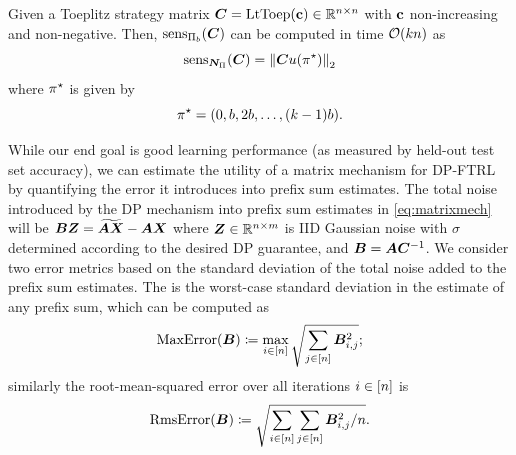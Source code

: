 \begin{theorem}\label{thm:toepminsepsens}
Given a Toeplitz strategy matrix ${\bm{C}} = \text{LtToep}(\mathbf{c}) \in \mathbb{R}^{n \times n}$ with $\mathbf{c}$ non-increasing and non-negative. Then, $\operatorname{sens}_{\Pi_b}({\bm{C}})$ can be computed in time $\mathcal{O}(k n)$  as
\[
  \operatorname{sens}_{{\bm{N}}_\Pi}({\bm{C}}) = \left\|{{\bm{C}} u(\pi^\star)}\right\|_2
\]
where $\pi^\star$ is given by
\begin{equation}\label{eq:badpi}
\pi^\star = (0, b, 2b, \dots, (k-1)b).
\end{equation}
\end{theorem}


\label{sec:mf_obj}

While our end goal is good learning performance (as measured by held-out test set accuracy), we can estimate the utility of a matrix mechanism for DP-FTRL by quantifying the error it introduces into prefix sum estimates. 
The total noise introduced by the DP mechanism into prefix sum estimates in \cref{eq:matrixmech} will be ${\bm{B}} {\bm{Z}} = \widetilde{{\bm{A}} {\bm{X}}} - {\bm{A}} {\bm{X}}$ where ${\bm{Z}} \in \mathbb{R}^{n \times m}$ is IID Gaussian noise with $\sigma$ determined according to the desired DP guarantee, and ${\bm{B}} = {\bm{A}} {\bm{C}}^{-1}$. We consider two error metrics based on the standard deviation of the total noise added to the prefix sum estimates.  The \maxerr is the worst-case standard deviation in the estimate of any prefix sum, which can be computed as %
%
{\small %
\[
\operatorname{MaxError}({\bm{B}}) \coloneqq \max_{i \in [n]} \sqrt{\sum_{j \in [n]} {\bm{B}}_{i,j}^2};
\]
}%
similarly the root-mean-squared error over all iterations $i \in [n]$ is %
{\small %
\[
\operatorname{RmsError}({\bm{B}}) \coloneqq 
\sqrt{\sum_{i \in [n]} \sum_{j \in [n]} {\bm{B}}_{i,j}^2 / n}.
\]
} %

